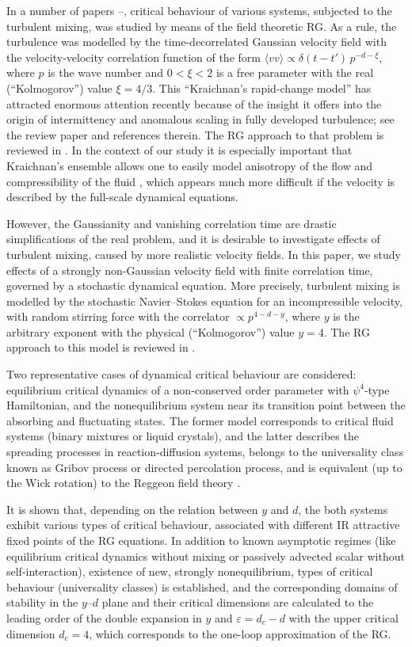 \documentclass[12pt]{iopart}
\begin{document}
In a number of papers \cite{Satten}--\cite{AIK}, critical behaviour of
various systems, subjected to the turbulent mixing, was studied by
means of the field theoretic RG. As a rule, the turbulence was modelled
by the time-decorrelated Gaussian velocity field
with the velocity-velocity correlation function of the form
$\langle vv\rangle \propto \delta(t-t') \, p^{-d-\xi}$, where
$p$ is the wave number and $0<\xi<2$ is a free parameter with the
real (``Kolmogorov'') value $\xi=4/3$.
This ``Kraichnan's rapid-change model'' has attracted enormous
attention recently because of the insight
it offers into the origin of intermittency and anomalous scaling in
fully developed turbulence; see the review paper \cite{FGV} and references
therein. The RG approach to that problem is reviewed in \cite{JPhysA}.
In the context of our study it is especially important that
Kraichnan's ensemble allows one to easily model anisotropy of
the flow \cite{Alexa} and compressibility of the fluid \cite{AIK},
which appears much more difficult if the velocity is described
by the full-scale dynamical equations.

However, the Gaussianity and vanishing correlation time are drastic
simplifications of the real problem, and it is desirable to investigate
effects of turbulent mixing, caused by more realistic velocity fields.
In this paper, we study effects of a strongly non-Gaussian velocity field
with finite correlation time, governed by a stochastic dynamical equation.
More precisely, turbulent mixing is modelled  by  the stochastic
Navier--Stokes equation for an incompressible velocity, with random stirring
force with the correlator $\propto p^{4-d-y}$, where $y$ is the arbitrary
exponent with the physical (``Kolmogorov'')  value  $y=4$. The RG approach
to this model is reviewed in \cite{Book3,turbo}.

Two representative cases of dynamical critical behaviour are considered:
equilibrium  critical dynamics of a non-conserved order parameter with
$\psi^4$-type Hamiltonian, and the nonequilibrium system near its
transition point between the absorbing and fluctuating states. The
former model corresponds to critical fluid systems (binary mixtures or
liquid crystals), and the latter describes the spreading processes in
reaction-diffusion  systems, belongs to the  universality class known
as Gribov process or directed percolation process, and is equivalent
(up to the Wick rotation) to the Reggeon field theory \cite{Hinr,JT}.

It is shown that, depending on the relation between $y$ and $d$, the both
systems exhibit various types of critical  behaviour,  associated  with
different IR attractive fixed points of the RG equations. In addition to
known asymptotic regimes (like equilibrium critical dynamics without mixing
or passively advected scalar without self-interaction), existence of new,
strongly nonequilibrium, types of critical behaviour (universality
classes) is established, and the corresponding domains of stability in the
$y$--$d$ plane and their critical dimensions are calculated to the leading
order of the double expansion in $y$ and $\varepsilon=d_c-d$ with the upper
critical dimension $d_c=4$, which corresponds to the one-loop approximation
of the RG.
\end{document}
